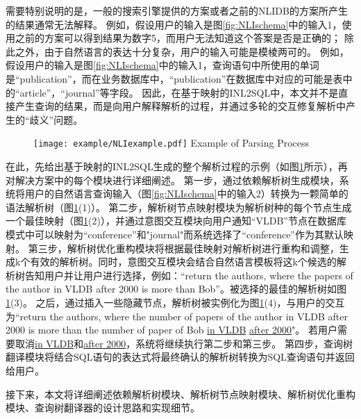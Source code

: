 需要特别说明的是，一般的搜索引擎提供的方案或者之前的NLIDB的方案所产生的结果通常无法解释。
例如，假设用户的输入是图\ref{fig:NLIschema}中的输入1，使用之前的方案可以得到结果为数字5，而用户无法知道这个答案是否是正确的；
除此之外，由于自然语言的表达十分复杂，用户的输入可能是模棱两可的。
例如，假设用户的输入是图\ref{fig:NLIschema}中的输入1，查询语句中所使用的单词是“publication”，而在业务数据库中，“publication”在数据库中对应的可能是表中的“article”，“journal”等字段。
因此，在基于映射的INL2SQL中，本文并不是直接产生查询的结果，而是向用户解释解析的过程，并通过多轮的交互修复解析中产生的“歧义”问题。

\begin{figure}[!htp]
  \centering
  \texttt{[image: example/NLIexample.pdf]}
    {Example of Parsing Process}
  \label{fig:NLIexample}
\end{figure}

在此，先给出基于映射的INL2SQL生成的整个解析过程的示例（如图\ref{fig:NLIexample}所示），再对解决方案中的每个模块进行详细阐述。
第一步，通过依赖解析树生成模块，系统将用户的自然语言查询输入（图\ref{fig:NLIschema}中的输入2）转换为一颗简单的语法解析树（图\ref{fig:NLIexample}(1)）。
第二步，解析树节点映射模块为解析树种的每个节点生成一个最佳映射（图\ref{fig:NLIexample}(2)），并通过意图交互模块向用户通知“VLDB”节点在数据库模式中可以映射为“conference”和"journal"而系统选择了“conference”作为其默认映射。
第三步，解析树优化重构模块将根据最佳映射对解析树进行重构和调整，生成k个有效的解析树。同时，意图交互模块会结合自然语言模板将这k个候选的解析树告知用户并让用户进行选择，例如：“return the authors, where the papers of the author in VLDB after 2000 is more than Bob”。被选择的最佳的解析树如图\ref{fig:NLIexample}(3)。
之后，通过插入一些隐藏节点，解析树被实例化为图\ref{fig:NLIexample}(4)，与用户的交互为“return the authors, where the number of papers of the author in VLDB after 2000 is more than the number of paper of Bob \underline{in VLDB} \underline{after 2000}"。
若用户需要取消\underline{in VLDB}和\underline{after 2000}，系统将继续执行第二步和第三步。
第四步，查询树翻译模块将结合SQL语句的表达式将最终确认的解析树转换为SQL查询语句并返回给用户。

接下来，本文将详细阐述依赖解析树模块、解析树节点映射模块、解析树优化重构模块、查询树翻译器的设计思路和实现细节。



